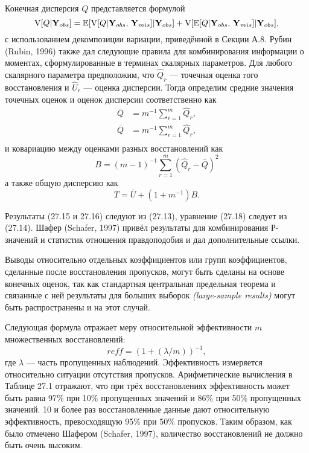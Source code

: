 Конечная дисперсия $Q$ представляется формулой
\begin{equation}
\mathrm{V}[Q|\mathbf{Y}_{obs}]=\mathbb{E}[\mathrm{V}[Q|\mathbf{Y}_{obs}, \, \mathbf{Y}_{mis}]|\mathbf{Y}_{obs}]+ \mathrm{V}[\mathbb{E}[Q|\mathbf{Y}_{obs}, \, \mathbf{Y}_{mis}]|\mathbf{Y}_{obs}],
\end{equation}
с использованием декомпозиции вариации, приведённой в Секции А.8.
Рубин (Rubin, 1996) также дал следующие правила для комбинирования информации о моментах, сформулированные в терминах скалярных параметров. Для любого скалярного параметра предположим, что $\widehat{Q}_r$ --- точечная оценка rого восстановления и $\widehat{U}_r$ --- оценка дисперсии. Тогда определим средние значения точечных оценок и оценок дисперсии соответственно как 
\begin{align}
\bar{Q}&=m^{-1} \sum \limits^{m}_{r=1}\widehat{Q}_r, \\
\bar{Q}&=m^{-1} \sum \limits^{m}_{r=1}\widehat{Q}_r, \\
\end{align}
и ковариацию между оценками разных восстановлений как
\begin{equation}
B=(m-1)^{-1} \sum \limits^{m}_{r=1}(\widehat{Q}_r - \bar{Q})^2
\end{equation}
а также общую дисперсию как
\begin{equation}
T=\bar{U}+(1+m^{-1})B.
\end{equation}

Результаты (27.15 и 27.16) следуют из (27.13), уравнение (27.18) следует из (27.14). Шафер (Schafer, 1997) привёл результаты для комбинирования Р-значений и статистик отношения правдоподобия и дал дополнительные ссылки.

Выводы относительно отдельных коэффициентов или групп коэффициентов, сделанные после восстановления пропусков, могут быть сделаны на основе конечных оценок, так как стандартная центральная предельная теорема и связанные с ней результаты для больших выборок \emph{(large-sample results)} могут быть распространены и на этот случай.

Следующая формула отражает меру относительной эффективности $m$ множественных восстановлений:
\begin{equation}
reff=(1+(\lambda/m))^{-1},
\end{equation}
где $\lambda$ --- часть пропущенных наблюдений. Эффективность измеряется относительно ситуации отсутствия пропусков. Арифметические вычисления в Таблице 27.1 отражают, что при трёх восстановлениях эффективность может быть равна 97\% при 10\% пропущенных значений и 86\% при 50\% пропущенных значений. 10 и более раз восстановленные данные дают относительную эффективность, превосходящую 95\% при 50\% пропусков. Таким образом, как было отмечено Шафером (Schafer, 1997), количество восстановлений не должно быть очень высоким.

